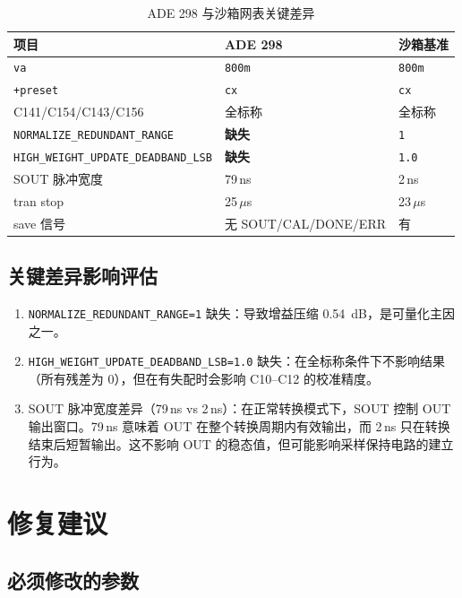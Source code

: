 \documentclass[12pt,a4paper]{article}
\begin{document}
\begin{table}[H]
\centering
\caption{ADE 298 与沙箱网表关键差异}
\label{tab:netlist_diff}
\begin{tabular}{lll}
\toprule
项目 & ADE 298 & 沙箱基准 \\
\midrule
\texttt{va} & \texttt{800m} & \texttt{800m} \\
\texttt{+preset} & \texttt{cx} & \texttt{cx} \\
C141/C154/C143/C156 & 全标称 & 全标称 \\
\texttt{NORMALIZE\_REDUNDANT\_RANGE} & \textbf{缺失} & \texttt{1} \\
\texttt{HIGH\_WEIGHT\_UPDATE\_DEADBAND\_LSB} & \textbf{缺失} & \texttt{1.0} \\
SOUT 脉冲宽度 & 79\,ns & 2\,ns \\
tran stop & 25\,$\mu$s & 23\,$\mu$s \\
save 信号 & 无 SOUT/CAL/DONE/ERR & 有 \\
\bottomrule
\end{tabular}
\end{table}

\subsection{关键差异影响评估}

\begin{enumerate}
\item \texttt{NORMALIZE\_REDUNDANT\_RANGE=1} 缺失：导致增益压缩 \SI{0.54}{dB}，是可量化主因之一。

\item \texttt{HIGH\_WEIGHT\_UPDATE\_DEADBAND\_LSB=1.0} 缺失：在全标称条件下不影响结果（所有残差为 0），但在有失配时会影响 C10--C12 的校准精度。

\item SOUT 脉冲宽度差异（79\,ns vs 2\,ns）：在正常转换模式下，SOUT 控制 OUT 输出窗口。79\,ns 意味着 OUT 在整个转换周期内有效输出，而 2\,ns 只在转换结束后短暂输出。这不影响 OUT 的稳态值，但可能影响采样保持电路的建立行为。
\end{enumerate}

\section{修复建议}

\subsection{必须修改的参数}
\end{document}
